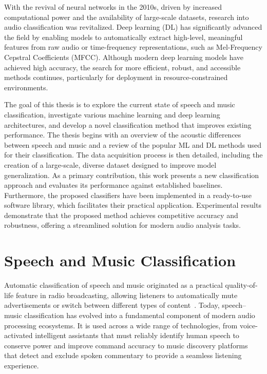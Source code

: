 With the revival of neural networks in the 2010s, driven by increased computational power and the availability of large-scale datasets, research into audio classification was revitalized. Deep learning (DL) has significantly advanced the field by enabling models to automatically extract high-level, meaningful features from raw audio or time-frequency representations, such as Mel-Frequency Cepstral Coefficients (MFCC).
Although modern deep learning models have achieved high accuracy, the search for more efficient, robust, and accessible methods continues, particularly for deployment in resource-constrained environments.

The goal of this thesis is to explore the current state of speech and music classification, investigate various machine learning and deep learning architectures, and develop a novel classification method that improves existing performance. 
The thesis begins with an overview of the acoustic differences between speech and music and a review of the popular ML and DL methods used for their classification. 
The data acquisition process is then detailed, including the creation of a large-scale, diverse dataset designed to improve model generalization. 
As a primary contribution, this work presents a new classification approach and evaluates its performance against established baselines. 
Furthermore, the proposed classifiers have been implemented in a ready-to-use software library, which facilitates their practical application. 
Experimental results demonstrate that the proposed method achieves competitive accuracy and robustness, offering a streamlined solution for modern audio analysis tasks.


\chapter{Speech and Music Classification}
\label{cap:theory_speech_music}
Automatic classification of speech and music originated as a practical quality-of-life feature in radio broadcasting, allowing listeners to automatically mute advertisements or switch between different types of content~\cite{543290}. 
Today, speech–music classification has evolved into a fundamental component of modern audio processing ecosystems. 
It is used across a wide range of technologies, from voice-activated intelligent assistants that must reliably identify human speech to conserve power and improve command accuracy to music discovery platforms that detect and exclude spoken commentary to provide a seamless listening experience.

